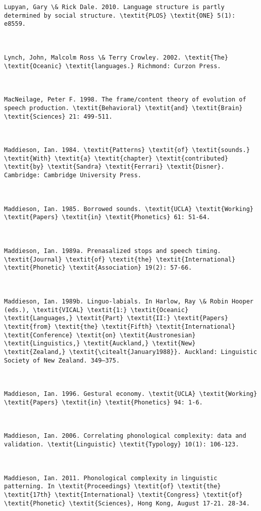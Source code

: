 \begin{verbatim}
Lupyan, Gary \& Rick Dale. 2010. Language structure is partly determined by social structure. \textit{PLOS} \textit{ONE} 5(1): e8559.



Lynch, John, Malcolm Ross \& Terry Crowley. 2002. \textit{The} \textit{Oceanic} \textit{languages.} Richmond: Curzon Press.



MacNeilage, Peter F. 1998. The frame/content theory of evolution of speech production. \textit{Behavioral} \textit{and} \textit{Brain} \textit{Sciences} 21: 499-511.



Maddieson, Ian. 1984. \textit{Patterns} \textit{of} \textit{sounds.} \textit{With} \textit{a} \textit{chapter} \textit{contributed} \textit{by} \textit{Sandra} \textit{Ferrari} \textit{Disner}. Cambridge: Cambridge University Press.



Maddieson, Ian. 1985. Borrowed sounds. \textit{UCLA} \textit{Working} \textit{Papers} \textit{in} \textit{Phonetics} 61: 51-64.



Maddieson, Ian. 1989a. Prenasalized stops and speech timing. \textit{Journal} \textit{of} \textit{the} \textit{International} \textit{Phonetic} \textit{Association} 19(2): 57-66.



Maddieson, Ian. 1989b. Linguo-labials. In Harlow, Ray \& Robin Hooper (eds.), \textit{VICAL} \textit{1:} \textit{Oceanic} \textit{Languages,} \textit{Part} \textit{II:} \textit{Papers} \textit{from} \textit{the} \textit{Fifth} \textit{International} \textit{Conference} \textit{on} \textit{Austronesian} \textit{Linguistics,} \textit{Auckland,} \textit{New} \textit{Zealand,} \textit{\citealt{January1988}}. Auckland: Linguistic Society of New Zealand. 349–375.



Maddieson, Ian. 1996. Gestural economy. \textit{UCLA} \textit{Working} \textit{Papers} \textit{in} \textit{Phonetics} 94: 1-6.



Maddieson, Ian. 2006. Correlating phonological complexity: data and validation. \textit{Linguistic} \textit{Typology} 10(1): 106-123.



Maddieson, Ian. 2011. Phonological complexity in linguistic patterning. In \textit{Proceedings} \textit{of} \textit{the} \textit{17th} \textit{International} \textit{Congress} \textit{of} \textit{Phonetic} \textit{Sciences}, Hong Kong, August 17-21. 28-34.




\end{verbatim}

